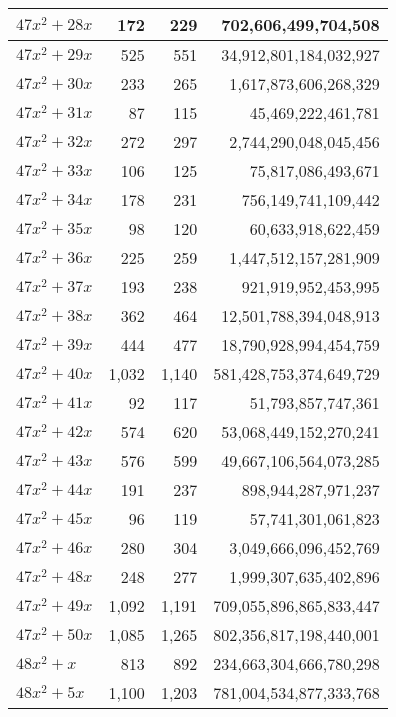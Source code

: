 \documentclass[a4paper]{amsproc}
\theoremstyle{plain}
\theoremstyle{named}
\begin{document}
\begin{longtable}{ | l | r | r | r | }
$47x^2 + 28x$ & 172 & 229 & 702{,}606{,}499{,}704{,}508 \\ \hline
$47x^2 + 29x$ & 525 & 551 & 34{,}912{,}801{,}184{,}032{,}927 \\ \hline
$47x^2 + 30x$ & 233 & 265 & 1{,}617{,}873{,}606{,}268{,}329 \\ \hline
$47x^2 + 31x$ & 87 & 115 & 45{,}469{,}222{,}461{,}781 \\ \hline
$47x^2 + 32x$ & 272 & 297 & 2{,}744{,}290{,}048{,}045{,}456 \\ \hline
$47x^2 + 33x$ & 106 & 125 & 75{,}817{,}086{,}493{,}671 \\ \hline
$47x^2 + 34x$ & 178 & 231 & 756{,}149{,}741{,}109{,}442 \\ \hline
$47x^2 + 35x$ & 98 & 120 & 60{,}633{,}918{,}622{,}459 \\ \hline
$47x^2 + 36x$ & 225 & 259 & 1{,}447{,}512{,}157{,}281{,}909 \\ \hline
$47x^2 + 37x$ & 193 & 238 & 921{,}919{,}952{,}453{,}995 \\ \hline
$47x^2 + 38x$ & 362 & 464 & 12{,}501{,}788{,}394{,}048{,}913 \\ \hline
$47x^2 + 39x$ & 444 & 477 & 18{,}790{,}928{,}994{,}454{,}759 \\ \hline
$47x^2 + 40x$ & 1{,}032 & 1{,}140 & 581{,}428{,}753{,}374{,}649{,}729 \\ \hline
$47x^2 + 41x$ & 92 & 117 & 51{,}793{,}857{,}747{,}361 \\ \hline
$47x^2 + 42x$ & 574 & 620 & 53{,}068{,}449{,}152{,}270{,}241 \\ \hline
$47x^2 + 43x$ & 576 & 599 & 49{,}667{,}106{,}564{,}073{,}285 \\ \hline
$47x^2 + 44x$ & 191 & 237 & 898{,}944{,}287{,}971{,}237 \\ \hline
$47x^2 + 45x$ & 96 & 119 & 57{,}741{,}301{,}061{,}823 \\ \hline
$47x^2 + 46x$ & 280 & 304 & 3{,}049{,}666{,}096{,}452{,}769 \\ \hline
$47x^2 + 48x$ & 248 & 277 & 1{,}999{,}307{,}635{,}402{,}896 \\ \hline
$47x^2 + 49x$ & 1{,}092 & 1{,}191 & 709{,}055{,}896{,}865{,}833{,}447 \\ \hline
$47x^2 + 50x$ & 1{,}085 & 1{,}265 & 802{,}356{,}817{,}198{,}440{,}001 \\ \hline
$48x^2 + x$ & 813 & 892 & 234{,}663{,}304{,}666{,}780{,}298 \\ \hline
$48x^2 + 5x$ & 1{,}100 & 1{,}203 & 781{,}004{,}534{,}877{,}333{,}768 \\ \hline

\end{longtable}
\end{document}
